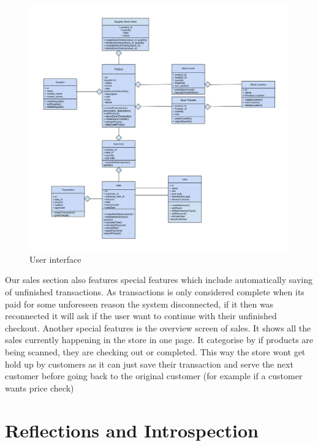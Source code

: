 \documentclass[a4paper]{article}
\begin{document}
\begin{figure}[h]
\centering
  \includegraphics[scale=0.01]{Class diagram.png}
	\caption{User interface}
\end{figure}

Our sales section also features special features which include automatically saving of unfinished transactions. As transactions is only considered complete when its paid for some unforeseen reason the system disconnected, if it then was reconnected it will ask if the user want to continue with their unfinished checkout. Another special features is the overview screen of sales. It shows all the sales currently happening in the store in one page. It categorise by if products are being scanned, they are checking out or completed. This way the store wont get hold up by customers as it can just save their transaction and serve the next customer before going back to the original customer (for example if a customer wants price check)  
 
\pagebreak

\section{Reflections and Introspection}
\end{document}

